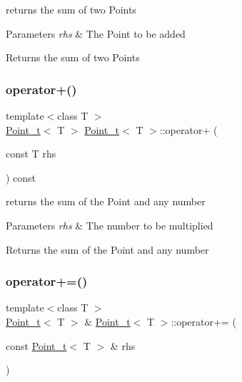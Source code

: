 returns the sum of two Points 


\begin{DoxyParams}{Parameters}
{\em rhs} & The Point to be added\\
\hline
\end{DoxyParams}
\begin{DoxyReturn}{Returns}
the sum of two Points 
\end{DoxyReturn}
\mbox{\label{class_point__t_a18aa50064d17f83d4880ecafbc1cc115}} 
\subsubsection{\texorpdfstring{operator+()}{operator+()}\hspace{0.1cm}{\footnotesize\ttfamily [2/2]}}
{\footnotesize\ttfamily template$<$class T $>$ \\
\hyperlink{class_point__t}{Point\+\_\+t}$<$ T $>$ \hyperlink{class_point__t}{Point\+\_\+t}$<$ T $>$\+::operator+ (\begin{DoxyParamCaption}\item[{const T}]{rhs }\end{DoxyParamCaption}) const}



returns the sum of the Point and any number 


\begin{DoxyParams}{Parameters}
{\em rhs} & The number to be multiplied\\
\hline
\end{DoxyParams}
\begin{DoxyReturn}{Returns}
the sum of the Point and any number 
\end{DoxyReturn}
\mbox{\label{class_point__t_abd0017d51000570cf8c5b071ef37aeb4}} 
\subsubsection{\texorpdfstring{operator+=()}{operator+=()}\hspace{0.1cm}{\footnotesize\ttfamily [1/2]}}
{\footnotesize\ttfamily template$<$class T $>$ \\
\hyperlink{class_point__t}{Point\+\_\+t}$<$ T $>$ \& \hyperlink{class_point__t}{Point\+\_\+t}$<$ T $>$\+::operator+= (\begin{DoxyParamCaption}\item[{const \hyperlink{class_point__t}{Point\+\_\+t}$<$ T $>$ \&}]{rhs }\end{DoxyParamCaption})}



